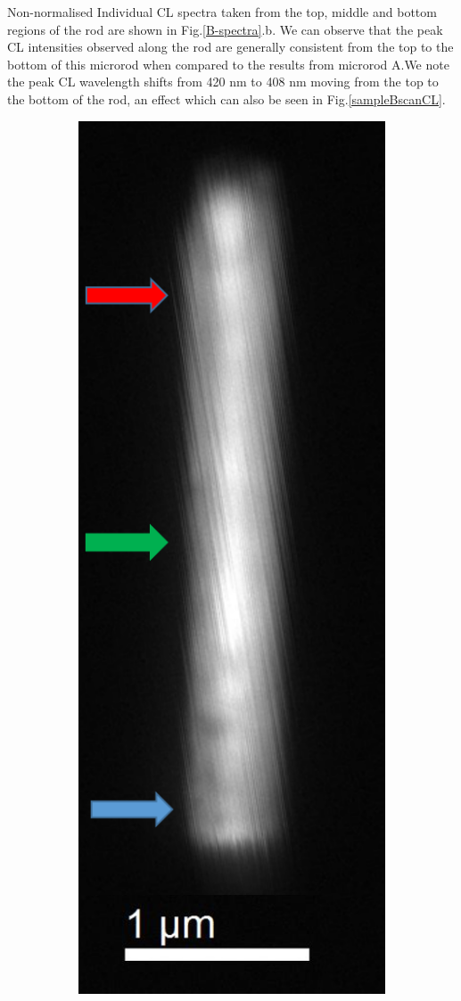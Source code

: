 Non-normalised Individual CL spectra taken from the top, middle and bottom regions of the rod are shown in Fig.\ref{B-spectra}.b. We can observe that the peak CL intensities observed along the rod are generally consistent from the top to the bottom of this microrod when compared to the results from microrod A.We note the peak CL wavelength shifts from 420 nm to 408 nm moving from the top to the bottom of the rod, an effect which can also be seen in Fig.\ref{sampleBscanCL}.

\begin{figure}[!th]
	\begin{subfigure}[!th]{0.3\textwidth}
		\centering
		\includegraphics[width=0.5\linewidth]{Figs/Ch6/CL-linescanloc2}
		\caption{}
		

\end{subfigure}
\end{figure}
